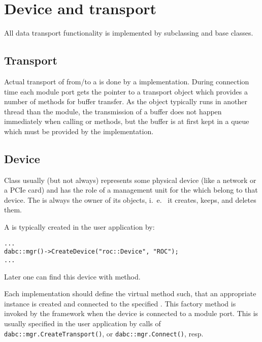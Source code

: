 \section{Device and transport}
\label{prog_plugin_device}
All data transport functionality is implemented by 
   subclassing   and  base classes.

\subsection{Transport}

Actual transport of  from/to a  is done by a  implementation.
During connection time each module port gets the pointer to a transport object
which provides a number of methods for buffer transfer. 
As the  object typically runs in another thread than the module,
the transmission of a buffer does not happen immediately when calling 
 or  methods, but
the buffer is at first kept in a queue which must be provided by the
 implementation.

 

\subsection{Device}
\label{prog_plugin_device_device}
Class  usually (but not always) represents some physical
device (like a network or a PCIe card) and has the role of a management unit for 
the  which belong to that device. 
The  is always the owner of its  objects, i.~e.~
it creates, keeps, and deletes them.

A  is typically created in the user application by:
\begin{small}
\begin{verbatim}
...
dabc::mgr()->CreateDevice("roc::Device", "ROC");
...
\end{verbatim}     
\end{small}

Later one can find this device with  method.

Each  implementation should define the virtual method  such, that an appropriate  instance 
is created and connected to the specified .
This factory method is invoked by the framework when the device is connected to 
a module port. This is usually specified in the user application by calls
of\\ 
{\tt dabc::mgr.CreateTransport()}, or {\tt dabc::mgr.Connect()},
resp.  

